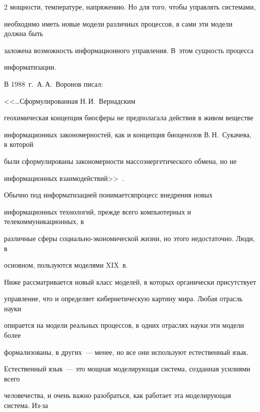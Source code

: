 \begin{multicols}{2}
мощности, температуре, напряжению. Но для того, чтобы управлять сис\-те\-мами, 


необходимо иметь новые модели различных процессов, в сами эти модели должна быть 


заложена возможность информационного управ\-ле\-ния. В~этом сущность процесса 


информатизации.


      


      В 1988~г.\ А.\,А.~Воронов писал: 


      


      <<\ldots Сформулированная Н.\,И.~Вернадским 


геохимическая концепция биосферы не предполагала действия в живом веществе 


информационных закономерностей, как и концепция биоценозов В.\,Н.~Сукачева, в которой 


были сформулированы закономерности массоэнергетического обмена, но не 


информационных взаимодействий>>~\cite{9-ign}.


      


      Обычно под информатизацией понимается\linebreak процесс внедрения новых 


информационных технологий, прежде всего компьютерных и телекоммуникационных, в 


различные сферы со\-ци\-аль\-но-эко\-но\-ми\-че\-ской жизни, но этого недостаточно. Люди, в 


основном, пользуются моделями XIX~в. 


      


      Ниже рассматривается новый класс моделей, в которых органически присутствует 


управ\-ле\-ние, что и определяет кибернетическую картину мира. Любая отрасль науки 


опирается на модели реальных процессов, в одних отраслях науки эти модели более 


формализованы, в других~--- менее, но все они используют естественный язык. 


Естественный язык~--- это мощная моделирующая сис\-те\-ма, созданная усилиями всего 


человечества, и очень важно разобраться, как работает эта моделирующая сис\-те\-ма. Из-за 



\end{multicols}
